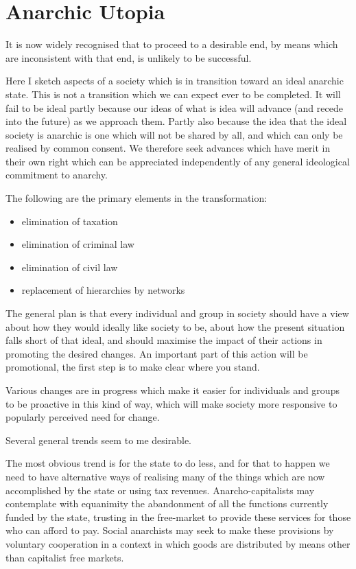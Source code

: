 \section{Anarchic Utopia}\label{utopia}

It is now widely recognised that to proceed to a desirable end, by means which are inconsistent with that end, is unlikely to be successful.

Here I sketch aspects of a society which is in transition toward an ideal anarchic state.
This is not a transition which we can expect ever to be completed.
It will fail to be ideal partly because our ideas of what is idea will advance (and recede into the future) as we approach them.
Partly also because the idea that the ideal society is anarchic is one which will not be shared by all, and which can only be realised by common consent.
We therefore seek advances which have merit in their own right which can be appreciated independently of any general ideological commitment to anarchy.

The following are the primary elements in the transformation:

\begin{itemize}
\item elimination of taxation
\item elimination of criminal law
\item elimination of civil law
\item replacement of hierarchies by networks
\end{itemize}

The general plan is that every individual and group in society should have a view about how they would ideally like society to be, about how the present situation falls short of that ideal, and should maximise the impact of their actions in promoting the desired changes.
An important part of this action will be promotional, the first step is to make clear where you stand.

Various changes are in progress which make it easier for individuals and groups to be proactive in this kind of way, which will make society more responsive to popularly perceived need for change.

Several general trends seem to me desirable.

The most obvious trend is for the state to do less, and for that to happen we need to have alternative ways of realising many of the things which are now accomplished by the state or using tax revenues.
Anarcho-capitalists may contemplate with equanimity the abandonment of all the functions currently funded by the state, trusting in the free-market to provide these services for those who can afford to pay.
Social anarchists may seek to make these provisions by voluntary cooperation in a context in which goods are distributed by means other than capitalist free markets.

